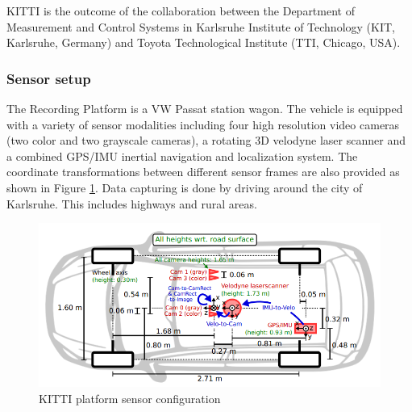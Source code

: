 
KITTI is the outcome of the collaboration between the Department of Measurement and Control Systems in Karlsruhe Institute of Technology (KIT, Karlsruhe, Germany) and Toyota Technological Institute (TTI, Chicago, USA).   

\subsubsection{Sensor setup}
The Recording Platform is a VW Passat station wagon. The vehicle is equipped with a variety of sensor modalities including four high resolution video cameras (two color and two grayscale cameras), a rotating
3D velodyne laser scanner and a combined GPS/IMU inertial navigation and localization system. The coordinate transformations between different sensor frames are also provided as shown in Figure \ref{kitti_sensors}. Data capturing is done by driving around the city of Karlsruhe. This includes highways and rural areas.

\begin{figure}[ht]
\includegraphics[width=\linewidth]{Figures/KITTI_sensors.png}
\centering
\caption{KITTI platform sensor configuration \cite{kitti}}
\label{kitti_sensors}
\end{figure}


